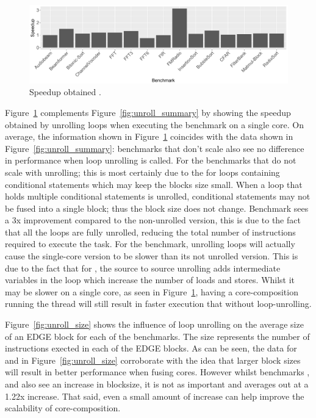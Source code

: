 \begin{figure}[t]
  \includegraphics[width=1\textwidth]{streamit-paper/graphics/unroll_speed_bars.pdf}
  \caption{Speedup obtained .}\label{fig:unroll_bars}
\end{figure}
Figure~\ref{fig:unroll_bars} complements Figure~\ref{fig:unroll_summary} by showing the speedup obtained by unrolling loops when executing the benchmark on a single core.
On average, the information shown in Figure~\ref{fig:unroll_bars} coincides with the data shown in Figure~\ref{fig:unroll_summary}: benchmarks that don't scale also see no difference in performance when loop unrolling is called.
For the benchmarks that do not scale with unrolling; this is most certainly due to the for loops containing conditional statements which may keep the blocks size small.
When a loop that holds multiple conditional statements is unrolled, conditional statements may not be fused into a single block; thus the block size does not change.
Benchmark  sees a 3x improvement compared to the non-unrolled version, this is due to the fact that all the loops are fully unrolled, reducing the total number of instructions required to execute the task.
For the  benchmark, unrolling loops will actually cause the single-core version to be slower than its not unrolled version.
This is due to the fact that for , the source to source unrolling adds intermediate variables in the loop which increase the number of loads and stores.
Whilst it may be slower on a single core, as seen in Figure~\ref{fig:unroll_bars}, having a core-composition running the thread will still result in faster execution that without loop-unrolling.

Figure~\ref{fig:unroll_size} shows the influence of loop unrolling on the average size of an EDGE block for each of the benchmarks.
The size represents the number of instructions exected in each of the EDGE blocks.
As can be seen, the data for  and  in Figure~\ref{fig:unroll_size} corroborate with the idea that larger block sizes will result in better performance when fusing cores.
However whilst benchmarks ,  and  also see an increase in blocksize, it is not as important and averages out at a 1.22x increase.
That said, even a small amount of increase can help improve the scalability of core-composition.

